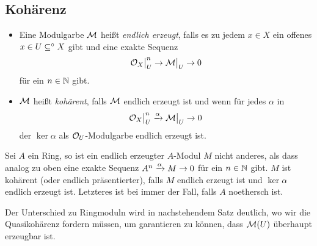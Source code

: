 \subsection{Kohärenz}
\begin{definition}
    
    \begin{itemize}
      \item Eine \OX Modulgarbe $\mathcal{M}$ heißt \emph{endlich erzeugt}, 
        falls es zu jedem $x\in X$ ein offenes $x\in U\subseteq^\circ X$ gibt 
        und eine exakte Sequenz
        \[\mathcal{O}_X\big|_{U}^n \to \mathcal{M}\big|_{U} \to 0\]
        für ein $n\in \mathbb{N}$ gibt.
      \item $\mathcal{M}$ heißt \emph{kohärent}, falls $\mathcal{M}$ endlich erzeugt ist und
        wenn für jedes $\alpha$ in
        \[\mathcal{O}_X\big|_{U}^n \xrightarrow\alpha \mathcal{M}\big|_{U} \to 0\]
        der $\ker \alpha$ als $\mathcal{O}_U$-Modulgarbe endlich erzeugt ist.
    \end{itemize}
\end{definition}

\begin{bemerkung}
    Sei $A$ ein Ring, so ist ein endlich erzeugter $A$-Modul $M$ nicht anderes, 
    als dass analog zu oben eine exakte Sequenz
    $ A^n \xrightarrow\alpha M \to 0$ für ein $n\in \mathbb{N}$ gibt. $M$ ist
    kohärent (oder endlich präsentierter), falls $M$ endlich erzeugt ist
    und $\ker \alpha$ endlich erzeugt ist. Letzteres ist bei immer der Fall,
    falls $A$ noethersch ist.
    
    Der Unterschied zu Ringmoduln wird in nachstehendem Satz deutlich,
    wo wir die Quasikohärenz fordern müssen, um garantieren zu können,
    dass $\mathcal{M}(U)$ überhaupt erzeugbar ist.  
\end{bemerkung}

